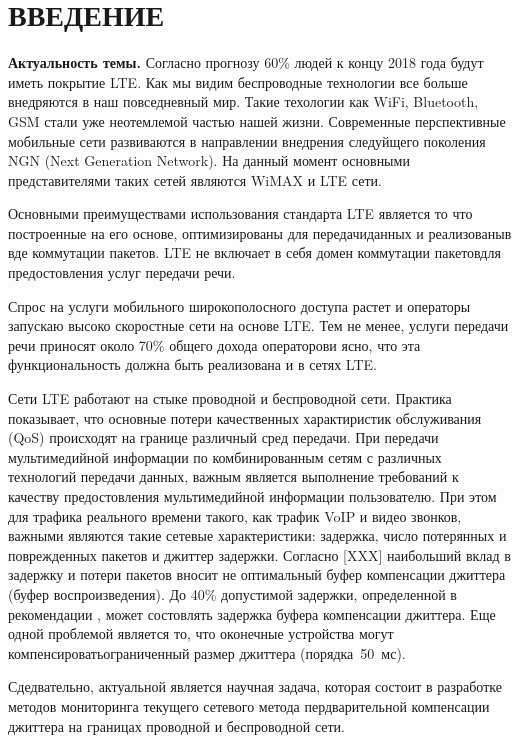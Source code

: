 \chapter*{ВВЕДЕНИЕ}							%

\textbf{Актуальность темы.} Согласно прогнозу \cite{ericsson} 60\% людей к концу 2018 года будут иметь покрытие LTE. Как мы видим беспроводные технологии все больше внедряются в наш повседневный мир. Такие техологии как WiFi, Bluetooth, GSM стали уже неотемлемой частью нашей жизни. 
Современные перспективные мобильные сети развиваются в направлении внедрения следуйщего поколения NGN (Next Generation Network). На данный момент основными представителями таких сетей являются WiMAX и LTE сети.

Основными преимуществами использования стандарта LTE является то что построенные на его основе, оптимизированы для передачиданных и реализованыв вде коммутации пакетов.
LTE не включает в себя домен коммутации пакетовдля предостовления услуг передачи речи.

Спрос на услуги мобильного широкополосного доступа растет и операторы запускаю высоко скоростные сети на основе LTE. Тем не менее, услуги передачи речи приносят около 70\% общего дохода операторови ясно, что эта функциональность должна быть реализована и в сетях LTE.

Сети LTE работают на стыке проводной и беспроводной сети. Практика показывает, что основные потери качественных характиристик обслуживания (QoS) происходят на границе различный сред передачи.
При передачи мультимедийной информации по комбинированным сетям с различных технологий передачи данных, важным является выполнение требований к качеству предостовления мультимедийной информации пользователю.
При этом для трафика реального времени такого, как трафик VoIP и видео звонков, важными являются такие сетевые характеристики:
задержка, число потерянных и поврежденных пакетов и джиттер задержки.
Согласно [XXX] наибольший вклад в задержку и потери пакетов вносит не оптимальный буфер компенсации джиттера (буфер воспроизведения). До 40\% допустимой задержки, определенной в рекомендации \cite{G114}, может состовлять задержка буфера компенсации джиттера.
Еще одной проблемой является то, что оконечные устройства могут компенсироватьограниченный размер джиттера (порядка~50~мс).

Сдедвательно, актуальной является научная задача, которая состоит в разработке методов мониторинга текущего сетевого метода пердварительной компенсации джиттера на границах проводной и беспроводной сети.


